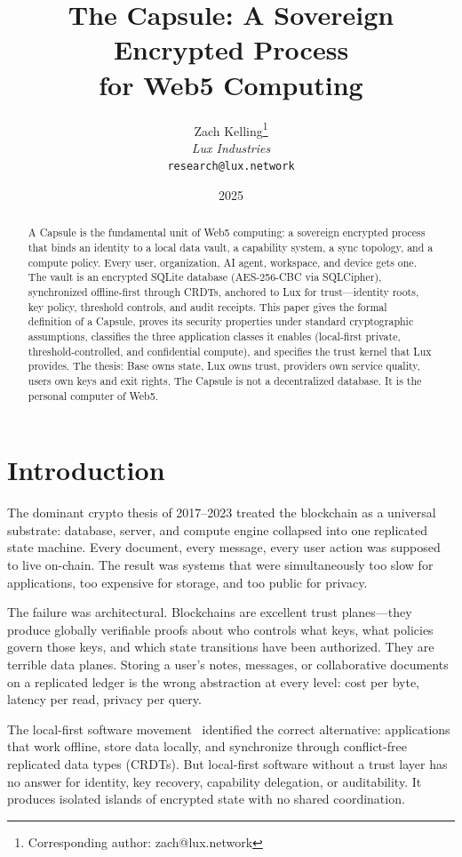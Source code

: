 \documentclass[11pt,a4paper]{article}
\title{\textbf{The Capsule: A Sovereign Encrypted Process\\for Web5 Computing}}
\author{
Zach Kelling\thanks{Corresponding author: zach@lux.network}\\
\textit{Lux Industries}\\
\texttt{research@lux.network}
}
\date{2025}
\begin{document}
\luxcoverpage

\begin{abstract}
A Capsule is the fundamental unit of Web5 computing: a sovereign encrypted process
that binds an identity to a local data vault, a capability system, a sync topology,
and a compute policy. Every user, organization, AI agent, workspace, and device
gets one. The vault is an encrypted SQLite database (AES-256-CBC via SQLCipher),
synchronized offline-first through CRDTs, anchored to Lux for trust---identity
roots, key policy, threshold controls, and audit receipts. This paper gives the
formal definition of a Capsule, proves its security properties under standard
cryptographic assumptions, classifies the three application classes it enables
(local-first private, threshold-controlled, and confidential compute), and
specifies the trust kernel that Lux provides. The thesis: Base owns state, Lux
owns trust, providers own service quality, users own keys and exit rights. The
Capsule is not a decentralized database. It is the personal computer of Web5.
\end{abstract}

\section{Introduction}\label{sec:intro}

The dominant crypto thesis of 2017--2023 treated the blockchain as a universal
substrate: database, server, and compute engine collapsed into one replicated
state machine. Every document, every message, every user action was supposed to
live on-chain. The result was systems that were simultaneously too slow for
applications, too expensive for storage, and too public for privacy.

The failure was architectural. Blockchains are excellent trust planes---they
produce globally verifiable proofs about who controls what keys, what policies
govern those keys, and which state transitions have been authorized. They are
terrible data planes. Storing a user's notes, messages, or collaborative documents
on a replicated ledger is the wrong abstraction at every level: cost per byte,
latency per read, privacy per query.

The local-first software movement~\cite{kleppmann2019} identified the correct
alternative: applications that work offline, store data locally, and synchronize
through conflict-free replicated data types (CRDTs). But local-first software
without a trust layer has no answer for identity, key recovery, capability
delegation, or auditability. It produces isolated islands of encrypted state
with no shared coordination.
\end{document}
